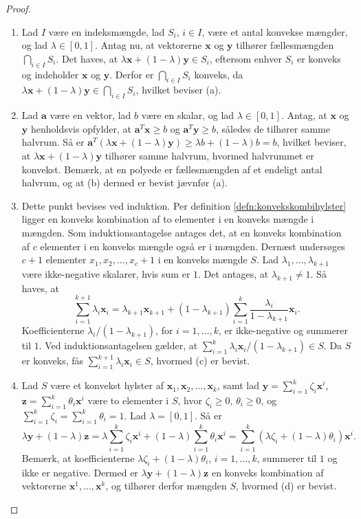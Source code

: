 %
%
\begin{proof}
\begin{enumerate}[label=(\alph*)]
	\item Lad $I$ være en indeksmængde, lad $S_i$, $i \in I$, være et antal konvekse mængder, og lad $ \lambda \in [0,1]$.
Antag nu, at vektorerne $\textbf{x}$ og $\textbf{y}$ tilhører fællesmængden $ \bigcap_{i \in I} S_i$. 
Det haves, at $ \lambda \textbf{x} + (1 - \lambda )\textbf{y} \in S_i$, eftersom enhver $S_i$ er konveks og  indeholder $\textbf{x}$ og $\textbf{y}$. Derfor er $ \bigcap_{i \in I} S_i$ konveks, da $ \lambda \textbf{x} + (1 - \lambda )\textbf{y} \in  \bigcap_{i \in I} S_i$, hvilket beviser (a). 
	\item Lad $\textbf{a}$ være en vektor, lad $b$ være en skalar, og lad $ \lambda \in [0,1]$. 
Antag, at $\textbf{x}$ og $\textbf{y}$ henholdsvis opfylder, at $\textbf{a}^T \textbf{x} \geq b$ og $\textbf{a}^T \textbf{y} \geq b$, således de tilhører samme halvrum. 
Så er $\textbf{a}^T (\lambda \textbf{x} + (1 - \lambda) \textbf{y} ) \geq \lambda b + (1 - \lambda ) b = b$, hvilket beviser, at $ \lambda \textbf{x} + (1 - \lambda )\textbf{y}$ tilhører samme halvrum, hvormed halvrummet er konvekst.
Bemærk, at en polyede er fællesmængden af et endeligt antal halvrum, og at (b) dermed er bevist jævnfør (a). 
	\item  Dette punkt bevises ved induktion.
Per definition \ref{defn:konvekskombihylster} ligger en konveks kombination af to elementer i en konveks mængde i mængden.
Som induktionsantagelse antages det, at en konveks kombination af $c$ elementer i en konveks mængde også er i mængden.
Dernæst undersøges $c+1$ elementer $x_1,x_2,\ldots,x_c+1$ i en konveks mængde $S$. 
Lad $\lambda_1,\ldots,\lambda_{k+1}$ være ikke-negative skalarer, hvis sum er $1$. 
Det antages, at $\lambda_{k+1}\neq1$. 
Så haves, at
$$\sum^{k+1}_{i=1}\lambda_i\textbf{x}_i=\lambda_{k+1}\textbf{x}_{k+1}+(1-\lambda_{k+1})\sum^{k}_{i=1}\dfrac{\lambda_i}{1-\lambda_{k+1}}\textbf{x}_i.$$
Koefficienterne $\lambda_i/(1-\lambda_{k+1})$, for $i=1,\ldots,k$, er ikke-negative og summerer til $1$. 
Ved induktionsantagelsen gælder, at $\sum^{k}_{i=1}\lambda_i\textbf{x}_i/(1-\lambda_{k+1})\in S$. 
Da $S$ er konveks, fås 
$\sum^{k+1}_{i=1}\lambda_i\textbf{x}_i\in S$, hvormed (c) er bevist. 
	\item Lad $S$ være et konvekst hylster af $\textbf{x}_1, \textbf{x}_2, \ldots, \textbf{x}_k$, samt lad $\textbf{y} = \sum_{i=1}^{k} \zeta_i \textbf{x}^i$, $\textbf{z} = \sum_{i=1}^{k} \theta_i \textbf{x}^i$ være to elementer i $S$, hvor $ \zeta_i \geq 0$, $ \theta_i \geq 0$, og $ \sum_{i=1}^{k} \zeta_i = \sum_{i=1}^{k} \theta_i = 1$. 
	Lad $ \lambda = [0,1]$. 
	Så er $$\lambda \textbf{y} + (1 - \lambda ) \textbf{z} = \lambda \sum_{i=1}^k \zeta_i \textbf{x}^i + (1 - \lambda) \sum_{i=1}^k \theta_i \textbf{x}^i = \sum_{i=1}^k (\lambda \zeta_i + (1-\lambda )\theta_i ) \textbf{x}^i.$$
Bemærk, at koefficienterne $ \lambda \zeta_i + (1 - \lambda) \theta_i$, $i = 1, \ldots, k$, summerer til $1$ og ikke er negative. 
Dermed er $ \lambda \textbf{y} + (1 - \lambda ) \textbf{z}$ en konveks kombination af vektorerne $\textbf{x}^1, \ldots, \textbf{x}^k$, og tilhører derfor mængden $S$, hvormed (d) er bevist. 
\end{enumerate}
\end{proof}